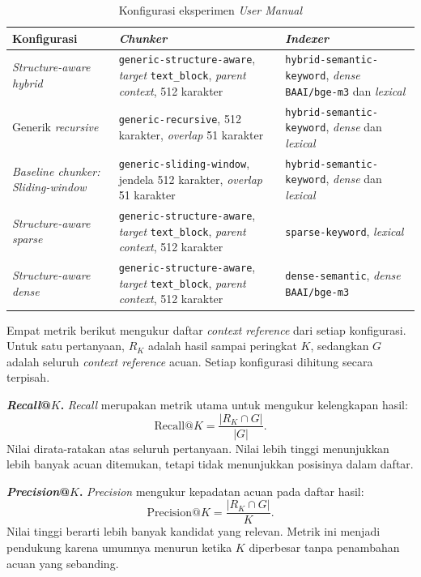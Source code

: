 \begin{table}[H]
\centering
\scriptsize
\caption{Konfigurasi eksperimen \emph{User Manual}}
\label{tab:customer-config}
\begin{tabularx}{\textwidth}{@{}>{\RaggedRight\arraybackslash}p{3.0cm}>{\RaggedRight\arraybackslash}p{5.0cm}>{\RaggedRight\arraybackslash}X@{}}
\toprule
\textbf{Konfigurasi} & \textbf{\emph{Chunker}} & \textbf{\emph{Indexer}}\\
\midrule
\emph{Structure-aware hybrid} & \texttt{generic-structure-aware}, \emph{target} \texttt{text\_block}, \emph{parent context}, 512 karakter & \texttt{hybrid-semantic-keyword}, \emph{dense} \texttt{BAAI/bge-m3} dan \emph{lexical}\\
Generik \emph{recursive} & \texttt{generic-recursive}, 512 karakter, \emph{overlap} 51 karakter & \texttt{hybrid-semantic-keyword}, \emph{dense} dan \emph{lexical}\\
\emph{Baseline chunker: Sliding-window} & \texttt{generic-sliding-window}, jendela 512 karakter, \emph{overlap} 51 karakter & \texttt{hybrid-semantic-keyword}, \emph{dense} dan \emph{lexical}\\
\emph{Structure-aware sparse} & \texttt{generic-structure-aware}, \emph{target} \texttt{text\_block}, \emph{parent context}, 512 karakter & \texttt{sparse-keyword}, \emph{lexical}\\
\emph{Structure-aware dense} & \texttt{generic-structure-aware}, \emph{target} \texttt{text\_block}, \emph{parent context}, 512 karakter & \texttt{dense-semantic}, \emph{dense} \texttt{BAAI/bge-m3}\\
\bottomrule
\end{tabularx}
\end{table}

Empat metrik berikut mengukur daftar \emph{context reference} dari setiap konfigurasi.
Untuk satu pertanyaan, \(R_K\) adalah hasil sampai peringkat \(K\), sedangkan \(G\) adalah
seluruh \emph{context reference} acuan. Setiap konfigurasi dihitung secara terpisah.

\noindent\textbf{\emph{Recall}@\(K\).}\quad
\emph{Recall} merupakan metrik utama untuk mengukur kelengkapan hasil:
\[
\mathrm{Recall}@K=\frac{\lvert R_K\cap G\rvert}{\lvert G\rvert}.
\]
Nilai dirata-ratakan atas seluruh pertanyaan. Nilai lebih tinggi menunjukkan lebih banyak
acuan ditemukan, tetapi tidak menunjukkan posisinya dalam daftar.

\noindent\textbf{\emph{Precision}@\(K\).}\quad
\emph{Precision} mengukur kepadatan acuan pada daftar hasil:
\[
\mathrm{Precision}@K=\frac{\lvert R_K\cap G\rvert}{K}.
\]
Nilai tinggi berarti lebih banyak kandidat yang relevan. Metrik ini menjadi pendukung karena
umumnya menurun ketika \(K\) diperbesar tanpa penambahan acuan yang sebanding.

